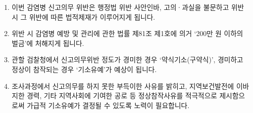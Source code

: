 \begin{enumerate}[첫째,]\tightlist
\item 이번 감염병 신고의무 위반은 행정법 위반 사안인바, 고의·과실을 불문하고 위반 시 그 위반에 따른 법적제재가 이루어지게 됩니다.
\item 위반 시 감염병 예방 및 관리에 관한 법률 제81조 제1호에 의거 ‘200만 원 이하의 벌금’에 처해지게 됩니다.
\item 관할 검찰청에서 신고의무위반 정도가 경미한 경우 ‘약식기소(구약식)’, 경미하고 정상이 참작되는 경우 ‘기소유예’가 예상이 됩니다.
\item 조사과정에서 신고의무를 하지 못한 부득이한 사유를 밝히고, 지역보건발전에 이바지한 경력, 기타 지역사회에 기여한 공로 등 정상참작사유를 적극적으로 제시함으로써 가급적 기소유예가 결정될 수 있도록 노력이 필요합니다.
\end{enumerate}
